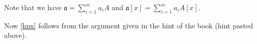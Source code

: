 \documentclass[parskip=half,fontsize=12pt]{scrartcl}%
\newcommand{\mf}{\mathfrak}
\newcommand{\aaa}{\mf a}
\newtheorem{qn}[thm]{Question}
\begin{document}
Note that we have $\aaa=\sum_{i=1}^ma_iA$ and $\aaa[x]=\sum_{i=1}^ma_iA[x]$.

Now \eqref{hpx} follows from the argument given in the hint of the book (hint pasted above).

%
\begin{comment}
\section{Questions}%

Let $A$ be a ring, and let $M,N,P$ be $A$-modules.



\begin{qn}
Consider the following conditions on a ring $A$:

\begin{enumerate}
\item\label{noe} $A$ is noetherian.
\item\label{dec} Each ideal of $A$ is decomposable.
\item\label{fmm} Each ideal of $A$ has only finitely many minimal primes over it.
\item\label{ip} Each irreducible ideal of $A$ is primary.
\item\label{fii} Each ideal of $A$ is a finite intersection of irreducible ideals.
\end{enumerate}

It is well known that item~\ref{noe} implies items \ref{dec}, \ref{fmm}, \ref{ip} and \ref{fii}.%

What are the implications between these conditions?
\end{qn}

The ideal would be to find a ring which satisfies items \ref{dec}, \ref{fmm}, \ref{ip} and \ref{fii}, but not item \ref{noe}.%

[About items \ref{fmm} and \ref{dec}, see Section~\ref{di} p.~\pageref{di}.]

About item \ref{ip}: There are rings in which $(0)$ is irreducible but not primary: see 

\href{https://mathoverflow.net/q/185739/461}{https://mathoverflow.net/q/185739/461}. 

In fact, the following statement is easy to check. Let $A$ be a domain which is not a field, let $K$ be its field of fractions, form the $A$-module $B:=A\oplus K/A$ and define a multiplication on $B$ by $$(a,\alpha)(b,\beta)=(ab,a\beta+b\alpha).$$ Then $B$ is a commutative ring in which the zero ideal is irreducible but not primary.
\end{comment}
\end{document}

